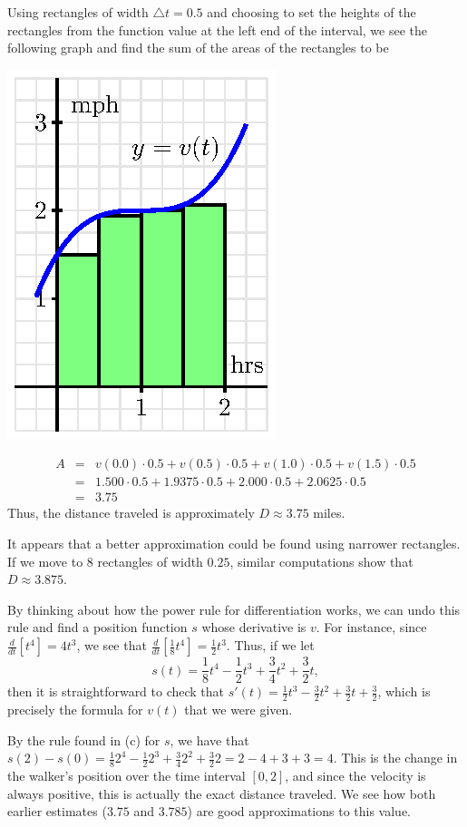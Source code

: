 \begin{activitySolution}
\ba
	\item Using rectangles of width $\triangle t = 0.5$ and choosing to set the heights of the rectangles from the function value at the left end of the interval, we see the following graph and find the sum of the areas of the rectangles to be
	\begin{center}
		\includegraphics{figures/4_1_Act1Soln.eps}
	\end{center}
	\begin{eqnarray*}
	A & = & v(0.0) \cdot 0.5 + v(0.5) \cdot 0.5 + v(1.0) \cdot 0.5 + v(1.5) \cdot 0.5 \\
	   & = & 1.500 \cdot 0.5 + 1.9375 \cdot 0.5 +  2.000 \cdot 0.5 + 2.0625 \cdot 0.5 \\
	   & = & 3.75
	\end{eqnarray*}
	Thus, the distance traveled is approximately $D \approx 3.75$ miles.
	\item It appears that a better approximation could be found using narrower rectangles.  If we move to 8 rectangles of width $0.25$, similar computations show that $D \approx 3.875$.
	\item By thinking about how the power rule for differentiation works, we can undo this rule and find a position function $s$ whose derivative is $v$.  For instance, since $\frac{d}{dt}[t^4] = 4t^3$, we see that $\frac{d}{dt}[\frac{1}{8}t^4] = \frac{1}{2}t^3$.  Thus, if we let 
	$$s(t) = \frac{1}{8}t^4 - \frac{1}{2} t^3 + \frac{3}{4} t^2 + \frac{3}{2}t,$$
	then it is straightforward to check that $s'(t) = \frac{1}{2}t^3 - \frac{3}{2}t^2 + \frac{3}{2}t + \frac{3}{2}$, which is precisely the formula for $v(t)$ that we were given.
	\item By the rule found in (c) for $s$, we have that $s(2) - s(0) = \frac{1}{8}2^4 - \frac{1}{2}2^3 + \frac{3}{4}2^2 + \frac{3}{2} 2 = 2 - 4 + 3 + 3 = 4$.  This is the change in the walker's position over the time interval $[0,2]$, and since the velocity is always positive, this is actually the exact distance traveled.  We see how both earlier estimates ($3.75$ and $3.785$) are good approximations to this value.
\ea
\end{activitySolution}
\aftera